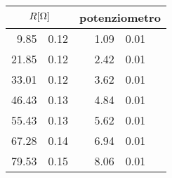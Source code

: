 \begin{tabular}{r@{ $\pm$ }lr@{ $\pm$ }l}
\multicolumn{2}{c}{$R [\unit[]{\ohm}]$} &\multicolumn{2}{c}{potenziometro} \\ 
\hline
9.85 & 0.12 & 1.09 & 0.01 \\ 
21.85 & 0.12 & 2.42 & 0.01 \\ 
33.01 & 0.12 & 3.62 & 0.01 \\ 
46.43 & 0.13 & 4.84 & 0.01 \\ 
55.43 & 0.13 & 5.62 & 0.01 \\ 
67.28 & 0.14 & 6.94 & 0.01 \\ 
79.53 & 0.15 & 8.06 & 0.01 \\ 
\end{tabular}
